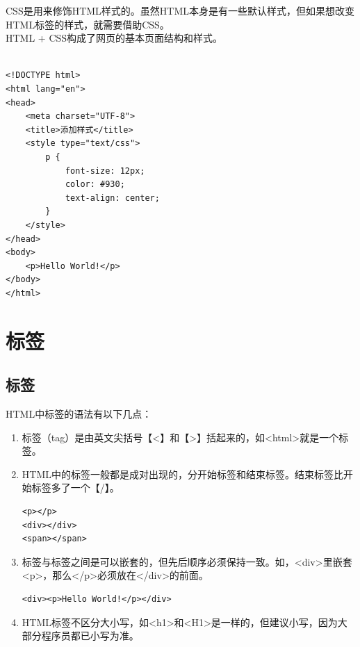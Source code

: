 CSS是用来修饰HTML样式的。虽然HTML本身是有一些默认样式，但如果想改变HTML标签的样式，就需要借助CSS。 \\

HTML + CSS构成了网页的基本页面结构和样式。 \\

 \\

\begin{lstlisting}[style=htmlcssjs]
<!DOCTYPE html>
<html lang="en">
<head>
    <meta charset="UTF-8">
    <title>添加样式</title>
    <style type="text/css">
        p {
            font-size: 12px;
            color: #930;
            text-align: center;
        }
    </style>
</head>
<body>
    <p>Hello World!</p>
</body>
</html>
\end{lstlisting}

\newpage

\section{标签}

\subsection{标签}

HTML中标签的语法有以下几点：

\begin{enumerate}
	\item 标签（tag）是由英文尖括号【<】和【>】括起来的，如<html>就是一个标签。

	\item HTML中的标签一般都是成对出现的，分开始标签和结束标签。结束标签比开始标签多了一个【/】。 \\
	      \begin{lstlisting}[style=htmlcssjs]
<p></p>
<div></div>
<span></span>
    \end{lstlisting}

	\item 标签与标签之间是可以嵌套的，但先后顺序必须保持一致。如，<div>里嵌套<p>，那么</p>必须放在</div>的前面。 \\
	      \begin{lstlisting}[style=htmlcssjs]
<div><p>Hello World!</p></div>
    \end{lstlisting}

	\item HTML标签不区分大小写，如<h1>和<H1>是一样的，但建议小写，因为大部分程序员都已小写为准。
\end{enumerate}

